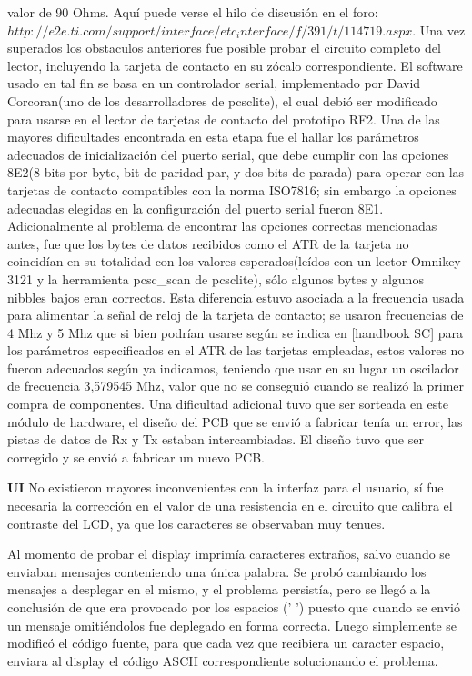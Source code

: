 valor de 90 Ohms. 
Aquí puede verse el hilo de discusión en el foro: ${http://e2e.ti.com/support/interface/etc_interface/f/391/t/114719.aspx}$.
Una vez superados los obstaculos anteriores fue posible probar el circuito completo del lector, incluyendo 
la tarjeta de contacto en su zócalo correspondiente. El software usado en tal fin se basa en un controlador
serial, implementado por David Corcoran(uno de los desarrolladores de pcsclite), el cual debió ser modificado
para usarse en el lector de tarjetas de contacto del prototipo RF2. Una de las mayores dificultades encontrada en esta 
etapa fue el hallar los parámetros adecuados de inicialización del puerto serial, que debe cumplir con las opciones 
8E2(8 bits por byte, bit de paridad par, y dos bits de parada) para operar con las tarjetas de contacto compatibles
con la norma ISO7816; sin embargo la opciones adecuadas elegidas en la configuración del puerto serial fueron 8E1.
Adicionalmente al problema de encontrar las opciones correctas mencionadas antes, fue que los bytes de datos
recibidos como el ATR de la tarjeta no coincidían en su totalidad con los valores esperados(leídos con un lector
Omnikey 3121 y la herramienta pcsc\_scan de pcsclite), sólo algunos bytes y algunos nibbles bajos eran correctos.
Esta diferencia estuvo asociada a la frecuencia usada para alimentar la señal de reloj de la tarjeta de contacto;
se usaron frecuencias de 4 Mhz y 5 Mhz que si bien podrían usarse según se indica en [handbook SC] para
los parámetros especificados en el ATR de las tarjetas empleadas, estos valores no fueron adecuados según ya indicamos,
teniendo que usar en su lugar un oscilador de frecuencia 3,579545 Mhz, valor que no se conseguió cuando se realizó
la primer compra de componentes.
Una dificultad adicional tuvo que ser sorteada en este módulo de hardware, el diseño del PCB que se envió a fabricar
tenía un error, las pistas de datos de Rx y Tx estaban intercambiadas. El diseño tuvo que ser corregido y se 
envió a fabricar un nuevo PCB.


\bigskip
\bigskip
{\bf{UI}}
\bigskip
No existieron mayores inconvenientes con la interfaz para el usuario, sí fue 
necesaria la corrección en el valor de una resistencia en el circuito que calibra 
el contraste del LCD, ya que los caracteres se observaban muy tenues.

\bigskip
\bigskip
Al momento de probar el display imprimía caracteres extraños, salvo cuando se enviaban mensajes conteniendo una única palabra. Se probó cambiando los mensajes a desplegar en el mismo, y el problema persistía, pero se llegó a la conclusión de que era provocado por los espacios (' ') puesto que cuando se envió un mensaje omitiéndolos fue deplegado en forma correcta. Luego simplemente se modificó el código fuente, para que cada vez que recibiera un caracter espacio, enviara al display el código ASCII correspondiente solucionando el problema.

